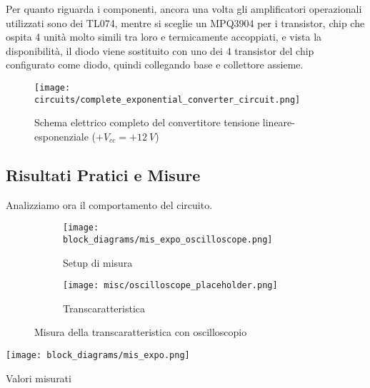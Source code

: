 Per quanto riguarda i componenti, ancora una volta gli amplificatori operazionali utilizzati
sono dei TL074, mentre si sceglie un MPQ3904 \cite{mpq3904} per i transistor, chip che
ospita 4 unità molto simili tra loro e termicamente accoppiati, e vista la disponibilità, il
diodo viene sostituito con uno dei 4 transistor del chip configurato come diodo, quindi
collegando base e collettore assieme.

\begin{figure}[H]
    \centering
    \texttt{[image: circuits/complete\_exponential\_converter\_circuit.png]}
    \caption{Schema elettrico completo del convertitore tensione lineare-esponenziale ($+V_{cc}=+12\ V$)}
    \label{complete_exponential_converter_circuit}
\end{figure}


\subsection*{Risultati Pratici e Misure}


Analizziamo ora il comportamento del circuito.

\begin{figure}[H]
    \centering

    \begin{subfigure}{.5\textwidth}
        \centering
        \texttt{[image: block\_diagrams/mis\_expo\_oscilloscope.png]}
        \caption{Setup di misura}
        \label{mis_expo_oscilloscope}
    \end{subfigure}%
    \begin{subfigure}{.5\textwidth}
        \centering
        \texttt{[image: misc/oscilloscope\_placeholder.png]}
        \caption{Transcaratteristica}
        \label{expo_transcharacteristic}
    \end{subfigure}

    \caption{Misura della transcaratteristica con oscilloscopio}
\end{figure}

\begin{minipage}{0.49\textwidth}
    \centering
    \texttt{[image: block\_diagrams/mis\_expo.png]}
    \label{mis_expo}
\end{minipage}
\begin{minipage}{0.49\textwidth}
    \centering
    \begin{table}[H]
        \centering
        \caption{Valori misurati}
        \label{expo_table}
    \end{table}
\end{minipage}

